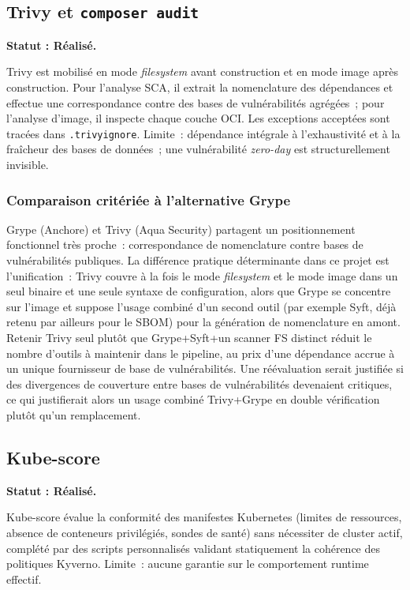 \subsection{Trivy et \texttt{composer audit}}
\textbf{Statut : Réalisé.}

Trivy est mobilisé en mode \textit{filesystem} avant construction et en mode image après construction. Pour l'analyse SCA, il extrait la nomenclature des dépendances et effectue une correspondance contre des bases de vulnérabilités agrégées~; pour l'analyse d'image, il inspecte chaque couche OCI. Les exceptions acceptées sont tracées dans \texttt{.trivyignore}. Limite~: dépendance intégrale à l'exhaustivité et à la fraîcheur des bases de données~; une vulnérabilité \textit{zero-day} est structurellement invisible.

\subsubsection{Comparaison critériée à l'alternative Grype}
Grype (Anchore) et Trivy (Aqua Security) partagent un positionnement fonctionnel très proche~: correspondance de nomenclature contre bases de vulnérabilités publiques. La différence pratique déterminante dans ce projet est l'unification~: Trivy couvre à la fois le mode \textit{filesystem} et le mode image dans un seul binaire et une seule syntaxe de configuration, alors que Grype se concentre sur l'image et suppose l'usage combiné d'un second outil (par exemple Syft, déjà retenu par ailleurs pour le SBOM) pour la génération de nomenclature en amont. Retenir Trivy seul plutôt que Grype+Syft+un scanner FS distinct réduit le nombre d'outils à maintenir dans le pipeline, au prix d'une dépendance accrue à un unique fournisseur de base de vulnérabilités. Une réévaluation serait justifiée si des divergences de couverture entre bases de vulnérabilités devenaient critiques, ce qui justifierait alors un usage combiné Trivy+Grype en double vérification plutôt qu'un remplacement.

\subsection{Kube-score}
\textbf{Statut : Réalisé.}

Kube-score évalue la conformité des manifestes Kubernetes (limites de ressources, absence de conteneurs privilégiés, sondes de santé) sans nécessiter de cluster actif, complété par des scripts personnalisés validant statiquement la cohérence des politiques Kyverno. Limite~: aucune garantie sur le comportement runtime effectif.

